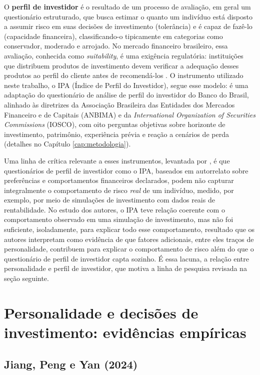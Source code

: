 O \textbf{perfil de investidor} é o resultado de um processo de avaliação,
em geral um questionário estruturado, que busca estimar o quanto um
indivíduo está disposto a assumir risco em suas decisões de investimento
(tolerância) e é capaz de fazê-lo (capacidade financeira), classificando-o
tipicamente em categorias como conservador, moderado e arrojado. No
mercado financeiro brasileiro, essa avaliação, conhecida como
\textit{suitability}, é uma exigência regulatória: instituições que
distribuem produtos de investimento devem verificar a adequação desses
produtos ao perfil do cliente antes de recomendá-los
\cite{cvm30_2021}. O instrumento utilizado neste trabalho, o IPA (Índice
de Perfil do Investidor), segue esse modelo: é uma adaptação do
questionário de análise de perfil do investidor do Banco do Brasil,
alinhado às diretrizes da Associação Brasileira das Entidades dos
Mercados Financeiro e de Capitais (ANBIMA) e da \textit{International
Organization of Securities Commissions} (IOSCO), com oito perguntas
objetivas sobre horizonte de investimento, patrimônio, experiência prévia
e reação a cenários de perda (detalhes no Capítulo \ref{cap:metodologia}).

Uma linha de crítica relevante a esses instrumentos, levantada por
, é que questionários de perfil de investidor
como o IPA, baseados em autorrelato sobre preferências e comportamentos
financeiros declarados, podem não capturar integralmente o comportamento
de risco \textit{real} de um indivíduo, medido, por exemplo, por meio de
simulações de investimento com dados reais de rentabilidade. No estudo
dos autores, o IPA teve relação coerente com o comportamento observado em
uma simulação de investimento, mas não foi suficiente, isoladamente, para
explicar todo esse comportamento, resultado que os autores interpretam
como evidência de que fatores adicionais, entre eles traços de
personalidade, contribuem para explicar o comportamento de risco além do
que o questionário de perfil de investidor capta sozinho. É essa lacuna,
a relação entre personalidade e perfil de investidor, que motiva a linha
de pesquisa revisada na seção seguinte.

\section{Personalidade e decisões de investimento: evidências empíricas}

\subsection{Jiang, Peng e Yan (2024)}
\label{sec:jiang}

